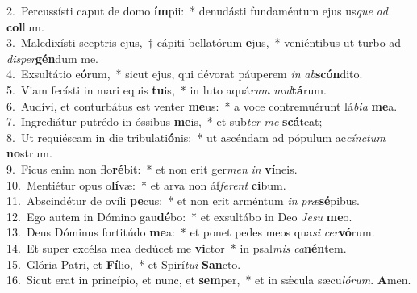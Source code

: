 {2.~}Percussísti caput de domo \textbf{ím}pii:~* denudásti fundaméntum ejus us\textit{que} \textit{ad} \textbf{col}lum.\\
{3.~}Maledixísti sceptris ejus,~† cápiti bellatórum \textbf{e}jus,~* veniéntibus ut turbo ad \textit{di}\textit{sper}\textbf{gén}dum me.\\
{4.~}Exsultátio e\textbf{ó}rum,~* sicut ejus, qui dévorat páuperem \textit{in} \textit{ab}\textbf{scón}dito.\\
{5.~}Viam fecísti in mari equis \textbf{tu}is,~* in luto aquá\textit{rum} \textit{mul}\textbf{tá}rum.\\
{6.~}Audívi, et conturbátus est venter \textbf{me}us:~* a voce contremuérunt lá\textit{bi}\textit{a} \textbf{me}a.\\
{7.~}Ingrediátur putrédo in óssibus \textbf{me}is,~* et sub\textit{ter} \textit{me} \textbf{scá}teat;\\
{8.~}Ut requiéscam in die tribulati\textbf{ó}nis:~* ut ascéndam ad pópulum ac\textit{cín}\textit{ctum} \textbf{no}strum.\\
{9.~}Ficus enim non flo\textbf{ré}bit:~* et non erit ger\textit{men} \textit{in} \textbf{ví}neis.\\
{10.~}Mentiétur opus o\textbf{lí}væ:~* et arva non áf\textit{fe}\textit{rent} \textbf{ci}bum.\\
{11.~}Abscindétur de ovíli \textbf{pe}cus:~* et non erit arméntum \textit{in} \textit{præ}\textbf{sé}pibus.\\
{12.~}Ego autem in Dómino gau\textbf{dé}bo:~* et exsultábo in Deo \textit{Je}\textit{su} \textbf{me}o.\\
{13.~}Deus Dóminus fortitúdo \textbf{me}a:~* et ponet pedes meos qua\textit{si} \textit{cer}\textbf{vó}rum.\\
{14.~}Et super excélsa mea dedúcet me \textbf{vi}ctor~* in psal\textit{mis} \textit{ca}\textbf{nén}tem.\\
{15.~}Glória Patri, et \textbf{Fí}lio,~* et Spirí\textit{tu}\textit{i} \textbf{San}cto.\\
{16.~}Sicut erat in princípio, et nunc, et \textbf{sem}per,~* et in sǽcula sæcu\textit{ló}\textit{rum}. \textbf{A}men.\\
